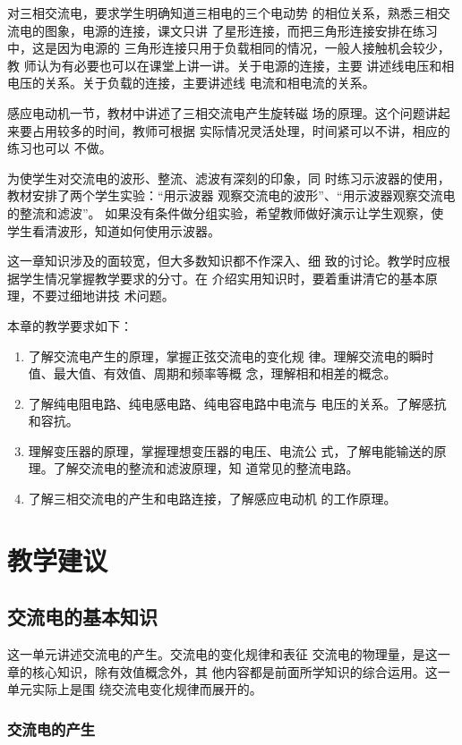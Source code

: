 对三相交流电，要求学生明确知道三相电的三个电动势
的相位关系，熟悉三相交流电的图象，电源的连接，课文只讲
了星形连接，而把三角形连接安排在练习中，这是因为电源的
三角形连接只用于负载相同的情况，一般人接触机会较少，教
师认为有必要也可以在课堂上讲一讲。关于电源的连接，主要
讲述线电压和相电压的关系。关于负载的连接，主要讲述线
电流和相电流的关系。

感应电动机一节，教材中讲述了三相交流电产生旋转磁
场的原理。这个问题讲起来要占用较多的时间，教师可根据
实际情况灵活处理，时间紧可以不讲，相应的练习也可以
不做。

为使学生对交流电的波形、整流、滤波有深刻的印象，同
时练习示波器的使用，教材安排了两个学生实验：“用示波器
观察交流电的波形”、“用示波器观察交流电的整流和滤波”。
如果没有条件做分组实验，希望教师做好演示让学生观察，使
学生看清波形，知道如何使用示波器。

这一章知识涉及的面较宽，但大多数知识都不作深入、细
致的讨论。教学时应根据学生情况掌握教学要求的分寸。在
介绍实用知识时，要着重讲清它的基本原理，不要过细地讲技
术问题。

本章的教学要求如下：
\begin{enumerate}
\item 了解交流电产生的原理，掌握正弦交流电的变化规
律。理解交流电的瞬时值、最大值、有效值、周期和频率等概
念，理解相和相差的概念。
\item 了解纯电阻电路、纯电感电路、纯电容电路中电流与
电压的关系。了解感抗和容抗。
\item 理解变压器的原理，掌握理想变压器的电压、电流公
式，了解电能输送的原理。了解交流电的整流和滤波原理，知
道常见的整流电路。
\item 了解三相交流电的产生和电路连接，了解感应电动机
的工作原理。
\end{enumerate}

\section{教学建议}
\subsection{交流电的基本知识}
这一单元讲述交流电的产生。交流电的变化规律和表征
交流电的物理量，是这一章的核心知识，除有效值概念外，其
他内容都是前面所学知识的综合运用。这一单元实际上是围
绕交流电变化规律而展开的。

\subsubsection{交流电的产生}

